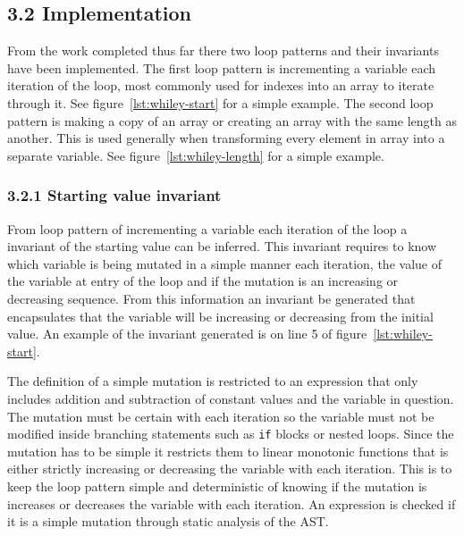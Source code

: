 \documentclass[11pt, a4paper, twoside, openright]{report}
\newcommand{\code}[1]{\texttt{#1}}
\begin{document}
\subsection*{3.2 Implementation}


From the work completed thus far there two loop patterns and their invariants
have been implemented. The first loop pattern is incrementing a variable
each iteration of the loop, most commonly used for indexes into an array to
iterate through it. See figure~\ref{lst:whiley-start} for a simple example.
The second loop pattern is making a copy of an array or creating an array with
the same length as another. 
This is used generally when transforming every element in array into a separate
variable. See figure~\ref{lst:whiley-length} for a simple example.


\subsubsection*{3.2.1 Starting value invariant}

From loop pattern of incrementing a variable each iteration of the loop
a invariant of the starting value can be inferred.
This invariant requires to know which variable is being 
mutated in a simple manner each iteration,
the value of the variable at entry of the loop and if the mutation is an
increasing or decreasing sequence.
From this information an invariant be generated that encapsulates that the
variable will be increasing or decreasing from the initial value.
An example of the invariant generated is on line 5 of
figure~\ref{lst:whiley-start}.

The definition of a simple mutation is restricted to an expression that only
includes addition and subtraction of constant values and the variable in question.
The mutation must be certain with each iteration so the variable must not be
modified inside branching statements such as \code{if} blocks or nested loops.
Since the mutation has to be simple it restricts them to linear monotonic
functions that is either strictly increasing or decreasing the variable with each iteration.
This is to keep the loop pattern simple and deterministic of knowing if the
mutation is increases or decreases the variable with each iteration.
An expression is checked if it is a simple mutation through static analysis of 
the AST.
\end{document}
